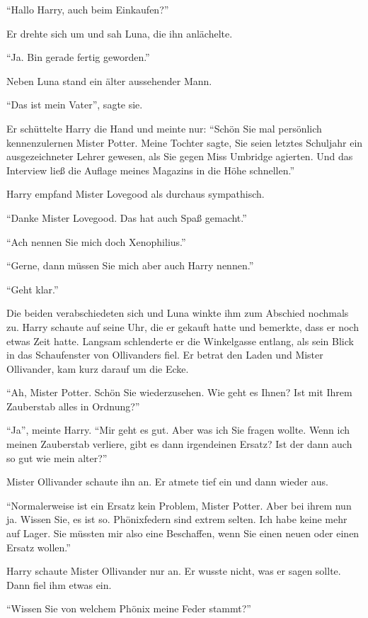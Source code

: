 \enquote{Hallo Harry, auch beim Einkaufen?}

Er drehte sich um und sah Luna, die ihn anlächelte.

\enquote{Ja. Bin gerade fertig geworden.}

Neben Luna stand ein älter aussehender Mann.

\enquote{Das ist mein Vater}, sagte sie.

Er schüttelte Harry die Hand und meinte nur: \enquote{Schön Sie mal persönlich kennenzulernen Mister Potter. Meine Tochter sagte, Sie seien letztes Schuljahr ein ausgezeichneter Lehrer gewesen, als Sie gegen Miss Umbridge agierten. Und das Interview ließ die Auflage meines Magazins in die Höhe schnellen.}

Harry empfand Mister Lovegood als durchaus sympathisch.

\enquote{Danke Mister Lovegood. Das hat auch Spaß gemacht.}

\enquote{Ach nennen Sie mich doch Xenophilius.}

\enquote{Gerne, dann müssen Sie mich aber auch Harry nennen.}

\enquote{Geht klar.}

Die beiden verabschiedeten sich und Luna winkte ihm zum Abschied nochmals zu. Harry schaute auf seine Uhr, die er gekauft hatte und bemerkte, dass er noch etwas Zeit hatte. Langsam schlenderte er die Winkelgasse entlang, als sein Blick in das Schaufenster von Ollivanders fiel. Er betrat den Laden und Mister Ollivander, kam kurz darauf um die Ecke.

\enquote{Ah, Mister Potter. Schön Sie wiederzusehen. Wie geht es Ihnen? Ist mit Ihrem Zauberstab alles in Ordnung?}

\enquote{Ja}, meinte Harry. \enquote{Mir geht es gut. Aber was ich Sie fragen wollte. Wenn ich meinen Zauberstab verliere, gibt es dann irgendeinen Ersatz? Ist der dann auch so gut wie mein alter?}

Mister Ollivander schaute ihn an. Er atmete tief ein und dann wieder aus.

\enquote{Normalerweise ist ein Ersatz kein Problem, Mister Potter. Aber bei ihrem \gst nun ja. Wissen Sie, es ist so. Phönixfedern sind extrem selten. Ich habe keine mehr auf Lager. Sie müssten mir also eine Beschaffen, wenn Sie einen neuen oder einen Ersatz wollen.}

Harry schaute Mister Ollivander nur an. Er wusste nicht, was er sagen sollte. Dann fiel ihm etwas ein.

\enquote{Wissen Sie von welchem Phönix meine Feder stammt?}

